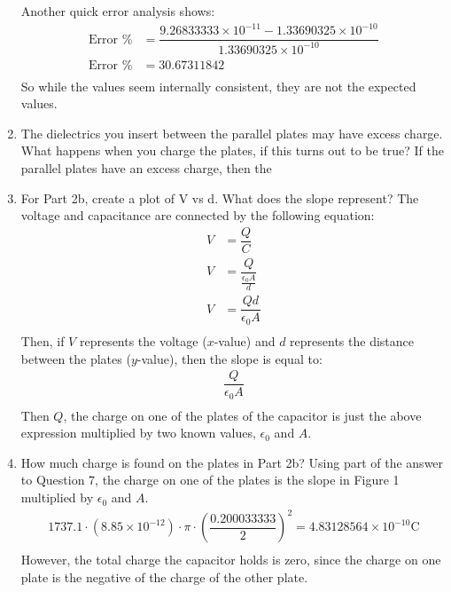 \documentclass [12pt, letterpaper, twoside] {article}
\begin{document}
\begin{enumerate}
  Another quick error analysis shows:
  \begin{equation*}
    \begin{split}
      \text{Error \%} &= \dfrac{9.26833333\times10^{-11} - 1.33690325\times10^{-10}}{1.33690325\times10^{-10}} \\
      \text{Error \%} &= 30.67311842 \\
    \end{split}
  \end{equation*}
  So while the values seem internally consistent, they are not the expected values.
  \item The dielectrics you insert between the parallel plates may have excess charge.  What happens when you charge the plates, if this turns out to be true?
  If the parallel plates have an excess charge, then the 
  \item For Part 2b, create a plot of V vs d.  What does the slope represent?
  The voltage and capacitance are connected by the following equation:
  \begin{equation*}
    \begin{split}
      V &= \dfrac{Q}{C} \\
      V &= \dfrac{Q}{\tfrac{\epsilon_{0}A}{d}} \\
      V &= \dfrac{Qd}{\epsilon_{0}A} \\
    \end{split}
  \end{equation*}
  Then, if \(V\) represents the voltage (\(x\)-value) and \(d\) represents the distance between the plates (\(y\)-value), then the slope is equal to:
  \begin{equation*}
    \begin{split}
      \dfrac{Q}{\epsilon_{0}A} \\
    \end{split}
  \end{equation*}
  Then \(Q\), the charge on one of the plates of the capacitor is just the above expression multiplied by two known values, \(\epsilon_{0}\) and \(A\).
  \item How much charge is found on the plates in Part 2b?
  Using part of the answer to Question 7, the charge on one of the plates is the slope in Figure 1 multiplied by \(\epsilon_{0}\) and \(A\).
  \begin{equation*}
    \begin{split}
      1737.1\cdot(8.85\times10^{-12})\cdot\pi\cdot{\left(\dfrac{0.200033333}{2}\right)}^2 = 4.83128564\times10^{-10} \text{C} \\
    \end{split}
  \end{equation*}
  However, the total charge the capacitor holds is zero, since the charge on one plate is the negative of the charge of the other plate.
\end{enumerate}
\end{document}
